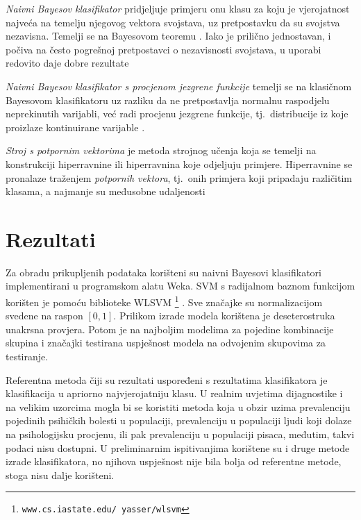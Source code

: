 \documentclass[10pt, a4paper]{article}
\begin{document}
\emph{Naivni Bayesov klasifikator} pridjeljuje primjeru onu klasu za koju je vjerojatnost najveća na temelju njegovog vektora svojstava, uz pretpostavku da su svojstva nezavisna. Temelji se na Bayesovom teoremu \citep{bayes-63}. Iako je prilično jednostavan, i počiva na često pogrešnoj pretpostavci o nezavisnosti svojstava, u uporabi redovito daje dobre rezultate \citep{hand-yu}

\emph{Naivni Bayesov klasifikator s procjenom jezgrene funkcije} temelji se na klasičnom Bayesovom klasifikatoru uz razliku da ne pretpostavlja normalnu raspodjelu neprekinutih varijabli, već radi procjenu jezgrene funkcije, tj.~distribucije iz koje proizlaze kontinuirane varijable \citep{john-95}.

\emph{Stroj s potpornim vektorima}  je metoda strojnog učenja koja se temelji na konstrukciji hiperravnine ili hiperravnina koje odjeljuju primjere. Hiperravnine se pronalaze traženjem \emph{potpornih vektora}, tj.~onih primjera koji pripadaju različitim klasama, a najmanje su međusobne udaljenosti \citep{cortes-vap}



\section{Rezultati}


 
Za obradu prikupljenih podataka korišteni su naivni Bayesovi klasifikatori implementirani u programskom alatu Weka. SVM s radijalnom baznom funkcijom korišten je pomoću biblioteke WLSVM \footnote{\texttt{www.cs.iastate.edu/~yasser/wlsvm}} \citep{yh05}. Sve značajke su normalizacijom svedene na raspon $[0,1]$. Prilikom izrade modela korištena je deseterostruka unakrsna provjera. Potom je na najboljim modelima za pojedine kombinacije skupina i značajki testirana uspješnost modela na odvojenim skupovima za testiranje.

Referentna metoda čiji su rezultati uspoređeni s rezultatima klasifikatora je klasifikacija u apriorno najvjerojatniju klasu. U realnim uvjetima dijagnostike i na velikim uzorcima mogla bi se koristiti metoda koja u obzir uzima prevalenciju pojedinih psihičkih bolesti u populaciji, prevalenciju u populaciji ljudi koji dolaze na psihologijsku procjenu, ili pak prevalenciju u populaciji pisaca, međutim, takvi podaci nisu dostupni. U preliminarnim ispitivanjima korištene su i druge metode izrade klasifikatora, no njihova uspješnost nije bila bolja od referentne metode, stoga nisu dalje korišteni.
\end{document}
